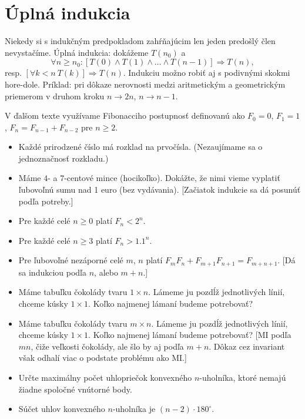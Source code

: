 \documentclass[a4paper, 11pt]{article}
\begin{document}
\section{Úplná indukcia}

Niekedy si s indukčným predpokladom zahŕňajúcim len jeden predošlý člen nevystačíme.
Úplná indukcia: dokážeme $T(n_0)$ a
$$
    \forall n\ge n_0: [T(0)\wedge T(1)\wedge\dots\wedge T(n-1)]\Rightarrow T(n),
$$
resp. $[\forall k < n\ T(k)]\Rightarrow T(n)$.
Indukciu možno robiť aj s podivnými skokmi hore-dole. Príklad: pri dôkaze nerovnosti medzi aritmetickým a geometrickým priemerom v druhom kroku $n \rightarrow 2n$, $n\rightarrow n-1$.

V ďalšom texte využívame Fibonacciho postupnosť definovanú ako $F_0=0$, $F_1=1$, $F_n = F_{n-1}+F_{n-2}$ pre $n\ge 2$.
\begin{itemize}
\item Každé prirodzené číslo má rozklad na prvočísla. (Nezaujímame sa o jednoznačnosť rozkladu.)
\item Máme $4$- a $7$-centové mince (hocikoľko). Dokážte, že nimi vieme vyplatiť ľubovoľnú sumu nad 1 euro (bez vydávania).
    [Začiatok indukcie sa dá posunúť podľa potreby.]
\item Pre každé celé $n\ge 0$ platí $F_n < 2^n$.
\item Pre každé celé $n\ge 3$ platí $F_n > 1.1^n$.
\item Pre ľubovoľné nezáporné celé $m$, $n$ platí $F_mF_n+F_{m+1}F_{n+1}=F_{m+n+1}$. [Dá sa indukciou podľa $n$, alebo $m+n$.]
\item Máme tabuľku čokolády tvaru $1\times n$. Lámeme ju pozdĺž jednotlivých línií, chceme kúsky $1\times 1$. Koľko najmenej lámaní budeme potrebovať?
\item Máme tabuľku čokolády tvaru $m\times n$. Lámeme ju pozdĺž jednotlivých línií, chceme kúsky $1\times 1$. Koľko najmenej lámaní budeme potrebovať?
    [MI podľa $mn$, čiže veľkosti čokolády, ale šlo by aj podľa $m+n$. Dôkaz cez invariant však odhalí viac o podstate problému ako MI.]
\item Určte maximálny počet uhlopriečok konvexného $n$-uholníka, ktoré nemajú žiadne spoločné vnútorné body.
\item Súčet uhlov konvexného $n$-uholníka je $(n-2)\cdot 180^\circ$.
\end{itemize}
\end{document}
